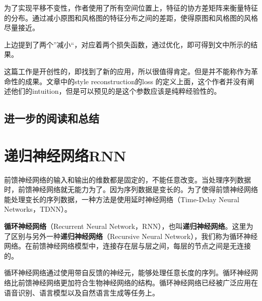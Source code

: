 \documentclass[11pt,fleqn, UTF8]{ctexbook} %
\begin{document}
为了实现平移不变性，作者使用了所有空间位置上，特征的协方差矩阵来衡量特征的分布。通过减小原图和风格图的特征分布之间的差距，使得原图和风格图的风格尽量接近。

上边提到了两个”减小“，对应着两个损失函数，通过优化，即可得到文中所示的结果。

这篇工作是开创性的，即找到了新的应用，所以很值得肯定。但是并不能称作为革命性的成果。文章中的style reconstruction的loss 的定义上面，这个作者并没有阐述他们的intuition，但是可以预见的是这个参数应该是纯粹经验性的。


\section{进一步的阅读和总结}
\chapter{递归神经网络RNN}
前馈神经网络的输入和输出的维数都是固定的，不能任意改变。当处理序列数据时，前馈神经网络就无能力为了。因为序列数据是变长的。为了使得前馈神经网络能处理变长的序列数据，一种方法是使用延时神经网络（Time-Delay Neural Networks，TDNN）\cite{waibel1989phoneme}。

\textbf{循环神经网络}（Recurrent Neural Network，RNN），也叫\textbf{递归神经网络}。这里为了区别与另外一种\textbf{递归神经网络}（Recursive Neural Network），我们称为循环神经网络。在前馈神经网络模型中，连接存在层与层之间，每层的节点之间是无连接的。

循环神经网络通过使用带自反馈的神经元，能够处理任意长度的序列。循环神经网络比前馈神经网络更加符合生物神经网络的结构。循环神经网络已经被广泛应用在语音识别、语言模型以及自然语言生成等任务上。
\end{document}

